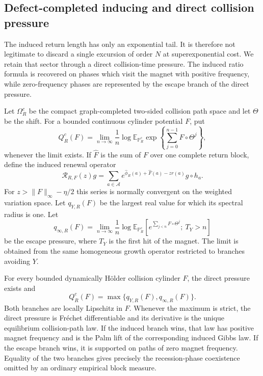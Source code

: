 \subsection{Defect-completed inducing and direct collision pressure}

The induced return length has only an exponential tail.  It is therefore not
legitimate to discard a single excursion of order \(N\) at superexponential
cost.  We retain that sector through a direct collision-time pressure.  The
induced ratio formula is recovered on phases which visit the magnet with
positive frequency, while zero-frequency phases are represented by the escape
branch of the direct pressure.

Let \(\Omega_R^c\) be the compact graph-completed two-sided collision path
space and let \(\Theta\) be the shift.  For a bounded continuous cylinder
potential \(F\), put
\[
 Q_R^c(F)=\lim_{n\to\infty}\frac1n
 \log\mathbb E_{\mathbb P_R^c}
 \exp\left\{\sum_{j=0}^{n-1}F\circ\Theta^j\right\},
\]
whenever the limit exists.  If \(\widehat F\) is the sum of \(F\) over one
complete return block, define the induced renewal operator
\[
 \mathscr R_{R,F}(z)g
 =\sum_{a\in\mathcal A}
 e^{\widehat\phi_R(a)+\widehat F(a)-z r(a)}
 g\circ h_a .
\]
For \(z>\|F\|_\infty-\eta/2\) this series is normally convergent on the
weighted variation space.  Let \(q_{Y,R}(F)\) be the largest real value for
which its spectral radius is one.  Let
\[
 q_{\infty,R}(F)
 =\lim_{n\to\infty}\frac1n
 \log\mathbb E_{\mathbb P_R^c}
 \left[
 e^{\sum_{j<n}F\circ\Theta^j};\
 T_Y>n
 \right]
\]
be the escape pressure, where \(T_Y\) is the first hit of the magnet.  The
limit is obtained from the same homogeneous growth operator restricted to
branches avoiding \(Y\).

\begin{theorem}
\label{thm:r3-a3-block}
For every bounded dynamically H\"older collision cylinder \(F\), the direct
pressure exists and
\[
 \boxed{Q_R^c(F)=\max\{q_{Y,R}(F),q_{\infty,R}(F)\}.}
\]
Both branches are locally Lipschitz in \(F\).  Whenever the maximum is strict,
the direct pressure is Fr\'echet differentiable and its derivative is the
unique equilibrium collision-path law.  If the induced branch wins, that law
has positive magnet frequency and is the Palm lift of the corresponding
induced Gibbs law.  If the escape branch wins, it is supported on paths of
zero magnet frequency.  Equality of the two branches gives precisely the
recession-phase coexistence omitted by an ordinary empirical block measure.
\end{theorem}


